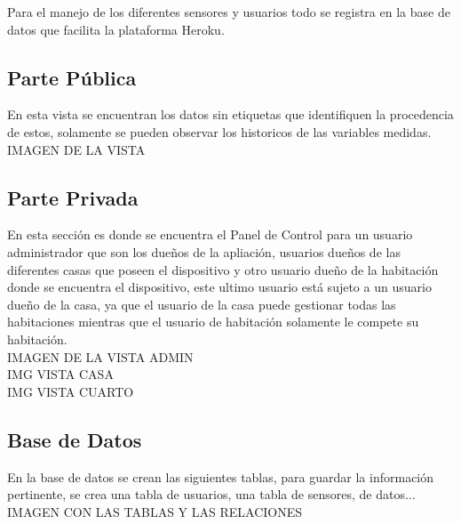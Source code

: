 Para el manejo de los diferentes sensores y usuarios todo se registra en la base de datos que facilita la plataforma Heroku.\\

\subsection{Parte Pública}

En esta vista se encuentran los datos sin etiquetas que identifiquen la procedencia de estos, solamente se pueden observar los historicos de las variables medidas.\\

IMAGEN DE LA VISTA

\subsection{Parte Privada}

En esta sección es donde se encuentra el Panel de Control para un usuario administrador que son los dueños de la apliación, usuarios dueños de las diferentes casas que poseen el dispositivo y otro usuario dueño de la habitación donde se encuentra el dispositivo, este ultimo usuario está sujeto a un usuario dueño de la casa, ya que el usuario de la casa puede gestionar todas las habitaciones mientras que el usuario de habitación solamente le compete su habitación.\\

IMAGEN DE LA VISTA ADMIN\\

IMG VISTA CASA\\

IMG VISTA CUARTO\\

\subsection{Base de Datos}

En la base de datos se crean las siguientes tablas, para guardar la información pertinente, se crea una tabla de usuarios, una tabla de sensores, de datos...\\

IMAGEN CON LAS TABLAS Y LAS RELACIONES
